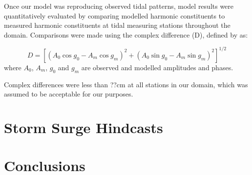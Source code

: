 \documentclass[pdftex,12pt]{article}
\begin{document}

Once our model was reproducing observed tidal patterns, model results were quantitatively evaluated by comparing modelled harmonic constituents to measured harmonic constituents at tidal measuring stations throughout the domain. Comparisons were made using the complex difference (D), defined by \citep{foreman1995tidal} as:

\begin{equation}
D = [(A_0 \cos g_0 - A_m \cos g_m)^2 + (A_0 \sin g_0 - A_m \sin g_m)^2]^{1/2}
\end{equation}
where $A_0$, $A_m$, $g_0$ and $g_m$ are observed and modelled amplitudes and phases.


Complex differences were less than ??cm at all stations in our domain, which was assumed to be acceptable for our purposes. 

\section{Storm Surge Hindcasts}\label{sec:storm}

\section{Conclusions}\label{sec:conclusions}




\end{document}
